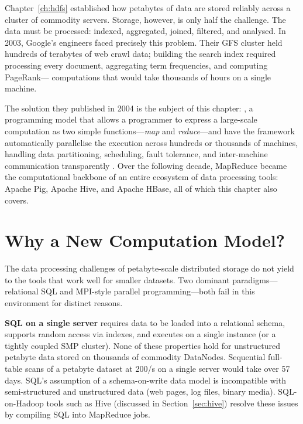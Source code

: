 \bigskip

Chapter~\ref{ch:hdfs} established how petabytes of data are stored
reliably across a cluster of commodity servers. Storage, however, is
only half the challenge. The data must be processed: indexed, aggregated,
joined, filtered, and analysed. In 2003, Google's engineers faced
precisely this problem. Their GFS cluster held hundreds of terabytes of
web crawl data; building the search index required processing every
document, aggregating term frequencies, and computing PageRank---
computations that would take thousands of hours on a single machine.

The solution they published in 2004 is the subject of this chapter:
, a programming model that allows a programmer to express
a large-scale computation as two simple functions---\emph{map} and
\emph{reduce}---and have the framework automatically parallelise the
execution across hundreds or thousands of machines, handling data
partitioning, scheduling, fault tolerance, and inter-machine
communication transparently \parencite{MapReduce2004}. Over the following
decade, MapReduce became the computational backbone of an entire
ecosystem of data processing tools: Apache Pig, Apache Hive, and Apache
HBase, all of which this chapter also covers.

\section{Why a New Computation Model?}
\label{sec:mr-motivation}

The data processing challenges of petabyte-scale distributed storage
do not yield to the tools that work well for smaller datasets. Two
dominant paradigms---relational SQL and MPI-style parallel
programming---both fail in this environment for distinct reasons.

\textbf{SQL on a single server} requires data to be loaded into a
relational schema, supports random access via indexes, and executes on
a single instance (or a tightly coupled SMP cluster). None of these
properties hold for unstructured petabyte data stored on thousands
of commodity DataNodes. Sequential full-table scans of a petabyte
dataset at 200\MB/s on a single server would take over 57 days.
SQL's assumption of a schema-on-write data model is incompatible with
semi-structured and unstructured data (web pages, log files, binary
media). SQL-on-Hadoop tools such as Hive (discussed in
Section~\ref{sec:hive}) resolve these issues by compiling SQL into
MapReduce jobs.

